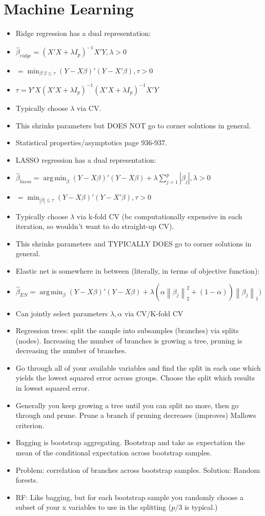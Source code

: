 \documentclass[11pt]{article} %
\DeclareMathOperator*{\argmin}{arg\,min}
\newcommand{\norm}[1]{\left\lVert#1\right\rVert}
\begin{document}
\section{Machine Learning} %
\begin{itemize}
\item Ridge regression has a dual representation:
\item $\hat{\beta}_{ridge} = (X'X + \lambda I_p )^{-1} X'Y, \lambda>0$
\item $= \min_{\beta'\beta \leq \tau} (Y-X\beta)'(Y-X'\beta), \tau>0$
\item $\tau = Y'X(X'X+\lambda I_p)^{-1} (X'X + \lambda I_p)^{-1}X'Y$
\item Typically choose $\lambda$ via CV.
\item This shrinks parameters but DOES NOT go to corner solutions in general.
\item Statistical properties/asymptotics page 936-937.
\item LASSO regression has a dual representation:
\item $\hat{\beta}_{lasso} = \argmin_{\beta} (Y-X\beta)'(Y-X\beta) + \lambda \sum_{j=1}^p |\beta_j|, \lambda>0$
\item $= \min_{|\beta| \leq \tau} (Y-X\beta)'(Y-X'\beta), \tau>0$
\item Typically choose $\lambda$ via k-fold CV (bc computationally expensive in each iteration, so wouldn't want to do straight-up CV).
\item This shrinks parameters and TYPICALLY DOES go to corner solutions in general.
\item Elastic net is somewhere in between (literally, in terms of objective function):
\item $\hat{\beta}_{EN} = \argmin_{\beta} (Y-X\beta)'(Y-X\beta) + \lambda( \alpha\norm{\beta_j}_2^2 + (1-\alpha))\norm{\beta_j}_1)$
\item Can jointly select parameters $\lambda,\alpha$ via CV/K-fold CV
\item Regression trees: split the sample into subsamples (branches) via splits (nodes). Increasing the number of branches is growing a tree, pruning is decreasing the number of branches.
\item Go through all of your available variables and find the split in each one which yields the lowest squared error across groups. Choose the split which results in lowest squared error.
\item Generally you keep growing a tree until you can split no more, then go through and prune. Prune a branch if pruning decreases (improves) Mallows criterion.
\item Bagging is bootstrap aggregating. Bootstrap and take as expectation the mean of the conditional expectation across bootstrap samples.
\item Problem: correlation of branches across bootstrap samples. Solution: Random forests.
\item RF: Like bagging, but for each bootstrap sample you randomly choose a subset of your x variables to use in the splitting ($p/3$ is typical.)
\end{itemize}
\end{document}
